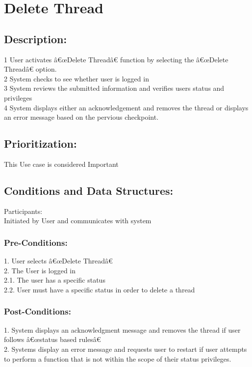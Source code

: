 \documentclass[a4paper,11pt]{article}
\begin{document}
\section{Delete Thread}
\subsection*{Description:}
1	User activates â€œDelete Threadâ€ function by selecting the â€œDelete Threadâ€ option.\\
2	System checks to see whether user is logged in\\
3	System reviews the submitted information and  verifies users status and privileges\\
4	System displays either an acknowledgement and removes the thread or displays an error message based on the pervious checkpoint.\\
\subsection{Prioritization:} 
This Use case is considered Important\\
\subsection{Conditions and Data Structures:}
Participants:\\
Initiated by User and communicates with system\\
\subsubsection*{Pre-Conditions:}
1.	User selects â€œDelete Threadâ€ \\
2.	The User is logged in \\
2.1.	The user has a specific status\\
2.2.	User must have a specific status in order to delete a thread\\
\subsubsection*{Post-Conditions:}
1.	System displays an acknowledgment message and removes  the thread  if user follows â€œstatus based rulesâ€\\
2.	Systems display an error message and requests user to restart if user attempts to perform a function that is not within the scope of their status privileges.\\
\end{document}
